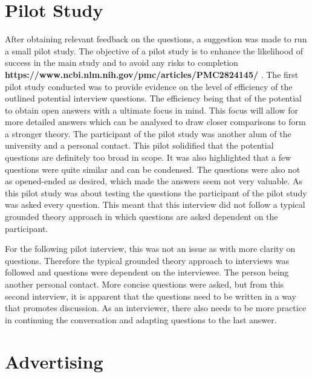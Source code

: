 \section{Pilot Study}

\par After obtaining relevant feedback on the questions, a suggestion was made to run a small pilot study.  The objective of a pilot study is to enhance the likelihood of success in the main study and to avoid any risks to completion
\textbf{https://www.ncbi.nlm.nih.gov/pmc/articles/PMC2824145/}
. The first pilot study conducted was to provide evidence on the level of efficiency of the outlined potential interview questions. The efficiency being that of the potential to obtain open answers with a ultimate focus in mind. This focus will allow for more detailed answers which can be analysed to draw closer comparisons to form a stronger theory. The participant of the pilot study was another alum of the university and a personal contact. This pilot solidified that the potential questions are definitely too broad in scope. It was also highlighted that a few questions were quite similar and can be condensed. The questions were also not as opened-ended as desired, which made the answers seem not very valuable. As this pilot study was about testing the questions the participant of the pilot study was asked every question. This meant that this interview did not follow a typical grounded theory approach in which questions are asked dependent on the participant. 
\newline
\par For the following pilot interview, this was not an issue as with more clarity on questions. Therefore the typical grounded theory approach to interviews was followed and questions were dependent on the interviewee. The person being another personal contact. More concise questions were asked, but from this second interview, it is apparent that the questions need to be written in a way that promotes discussion. As an interviewer, there also needs to be more practice in continuing the conversation and adapting questions to the last answer. 

\section{Advertising}

